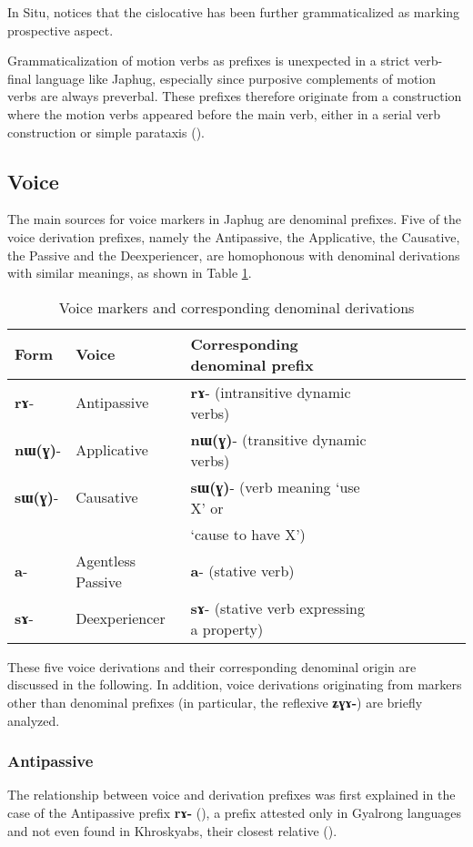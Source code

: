 \documentclass[oldfontcommands,oneside,a4paper,11pt]{article}
\newcommand{\ipa}[1]{\mbox{\phon\textbf{#1}}} %
\begin{document}
In Situ, \citet{youjing03zhuokeji} notices that the cislocative has been further grammaticalized as marking prospective aspect.

Grammaticalization of motion verbs as prefixes is unexpected in a strict verb-final language like Japhug, especially since purposive complements of motion verbs are always preverbal. These prefixes therefore originate from a construction where the motion verbs appeared before the main verb, either in a serial verb construction or simple parataxis (\citealt{jacques13harmonization}).

\subsection{Voice} \label{sec:voice}
The main sources for voice markers in Japhug are denominal prefixes. Five of the voice derivation prefixes, namely the Antipassive, the Applicative, the Causative, the Passive and the Deexperiencer, are homophonous with denominal derivations with similar meanings, as shown in Table \ref{tab:denom}.

\begin{table}[H] \caption{Voice markers and corresponding denominal derivations} \label{tab:denom} \centering
\begin{tabular}{lllllllll} \toprule
Form& Voice & Corresponding denominal prefix \\
\midrule
\ipa{rɤ}- & Antipassive &    \ipa{rɤ}- (intransitive dynamic verbs)\\
\ipa{nɯ(ɣ)}- & Applicative &    \ipa{nɯ(ɣ)}- (transitive dynamic verbs)\\
\ipa{sɯ(ɣ)}- & Causative &    \ipa{sɯ(ɣ)}- (verb meaning `use X' or \\
&& `cause to have X') \\
\ipa{a}- & Agentless Passive &    \ipa{a}- (stative verb)\\
\ipa{sɤ}-  & Deexperiencer &    \ipa{sɤ}- (stative verb expressing a property)\\
    \bottomrule
\end{tabular}
\end{table}

These five voice derivations and their corresponding denominal origin are discussed in the following. In addition, voice derivations originating from markers other than denominal prefixes (in particular, the reflexive \ipa{ʑɣɤ-}) are briefly analyzed.

\subsubsection{Antipassive} \label{sec:apass}
The relationship between voice and derivation prefixes was first explained in the case of the Antipassive prefix \ipa{rɤ-} (\citealt{jacques14antipassive}), a prefix attested only in Gyalrong languages and not even found in Khroskyabs, their closest relative (\citealt{lai13affixale}).
\end{document}
